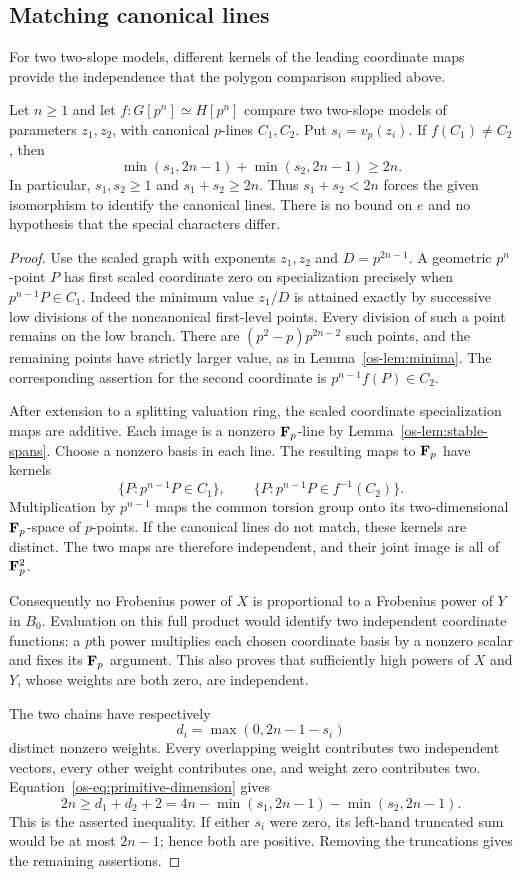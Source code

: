 \subsection{Matching canonical lines}
For two two-slope models, different kernels of the leading coordinate maps provide the independence that the polygon comparison supplied above.

\begin{lemma}\label{os-lem:canonical-matching}
Let $n\ge1$ and let $f:G[p^n]\simeq H[p^n]$ compare two two-slope models of parameters $z_1,z_2$, with canonical $p$-lines $C_1,C_2$. Put $s_i=v_p(z_i)$. If $f(C_1)\ne C_2$, then
\[
 \min(s_1,2n-1)+\min(s_2,2n-1)\ge2n.
\]
In particular, $s_1,s_2\ge1$ and $s_1+s_2\ge2n$. Thus $s_1+s_2<2n$ forces the given isomorphism to identify the canonical lines. There is no bound on $e$ and no hypothesis that the special characters differ.
\end{lemma}
\begin{proof}
Use the scaled graph with exponents $z_1,z_2$ and $D=p^{2n-1}$. A geometric $p^n$-point $P$ has first scaled coordinate zero on specialization precisely when $p^{n-1}P\in C_1$. Indeed the minimum value $z_1/D$ is attained exactly by successive low divisions of the noncanonical first-level points. Every division of such a point remains on the low branch. There are $(p^2-p)p^{2n-2}$ such points, and the remaining points have strictly larger value, as in Lemma~\ref{os-lem:minima}. The corresponding assertion for the second coordinate is $p^{n-1}f(P)\in C_2$.

After extension to a splitting valuation ring, the scaled coordinate specialization maps are additive. Each image is a nonzero $\mathbf F_p$-line by Lemma~\ref{os-lem:stable-spans}. Choose a nonzero basis in each line. The resulting maps to $\mathbf F_p$ have kernels
\[
 \{P:p^{n-1}P\in C_1\},\qquad
 \{P:p^{n-1}P\in f^{-1}(C_2)\}.
\]
Multiplication by $p^{n-1}$ maps the common torsion group onto its two-dimensional $\mathbf F_p$-space of $p$-points. If the canonical lines do not match, these kernels are distinct. The two maps are therefore independent, and their joint image is all of $\mathbf F_p^2$.

Consequently no Frobenius power of $X$ is proportional to a Frobenius power of $Y$ in $B_0$. Evaluation on this full product would identify two independent coordinate functions: a $p$th power multiplies each chosen coordinate basis by a nonzero scalar and fixes its $\mathbf F_p$ argument. This also proves that sufficiently high powers of $X$ and $Y$, whose weights are both zero, are independent.

The two chains have respectively
\[
 d_i=\max(0,2n-1-s_i)
\]
distinct nonzero weights. Every overlapping weight contributes two independent vectors, every other weight contributes one, and weight zero contributes two. Equation~\eqref{os-eq:primitive-dimension} gives
\[
 2n\ge d_1+d_2+2
   =4n-\min(s_1,2n-1)-\min(s_2,2n-1).
\]
This is the asserted inequality. If either $s_i$ were zero, its left-hand truncated sum would be at most $2n-1$; hence both are positive. Removing the truncations gives the remaining assertions.
\end{proof}

